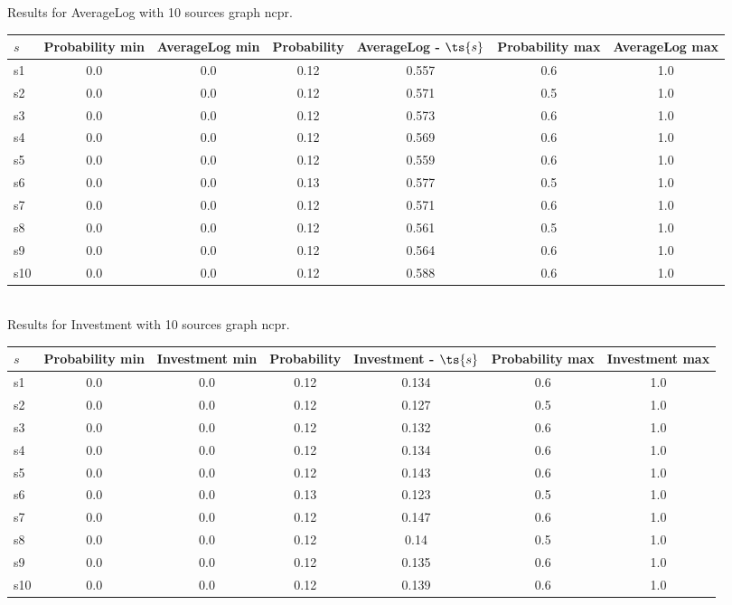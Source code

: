 \documentclass{article}
\begin{document}
\noindent Results for AverageLog with 10 sources graph ncpr.

\noindent\begin{tabular}{|l|c|c|c|c|c|c|}
\hline
$s$& Probability min & AverageLog min & Probability & AverageLog - $\ts{s}$ & Probability max & AverageLog max\\
\hline
s1 &0.0 & 0.0 & 0.12 & 0.557 & 0.6 & 1.0\\
\hline
s2 &0.0 & 0.0 & 0.12 & 0.571 & 0.5 & 1.0\\
\hline
s3 &0.0 & 0.0 & 0.12 & 0.573 & 0.6 & 1.0\\
\hline
s4 &0.0 & 0.0 & 0.12 & 0.569 & 0.6 & 1.0\\
\hline
s5 &0.0 & 0.0 & 0.12 & 0.559 & 0.6 & 1.0\\
\hline
s6 &0.0 & 0.0 & 0.13 & 0.577 & 0.5 & 1.0\\
\hline
s7 &0.0 & 0.0 & 0.12 & 0.571 & 0.6 & 1.0\\
\hline
s8 &0.0 & 0.0 & 0.12 & 0.561 & 0.5 & 1.0\\
\hline
s9 &0.0 & 0.0 & 0.12 & 0.564 & 0.6 & 1.0\\
\hline
s10 &0.0 & 0.0 & 0.12 & 0.588 & 0.6 & 1.0\\
\hline
\end{tabular}\\

\noindent Results for Investment with 10 sources graph ncpr.

\noindent\begin{tabular}{|l|c|c|c|c|c|c|}
\hline
$s$& Probability min & Investment min & Probability & Investment - $\ts{s}$ & Probability max & Investment max\\
\hline
s1 &0.0 & 0.0 & 0.12 & 0.134 & 0.6 & 1.0\\
\hline
s2 &0.0 & 0.0 & 0.12 & 0.127 & 0.5 & 1.0\\
\hline
s3 &0.0 & 0.0 & 0.12 & 0.132 & 0.6 & 1.0\\
\hline
s4 &0.0 & 0.0 & 0.12 & 0.134 & 0.6 & 1.0\\
\hline
s5 &0.0 & 0.0 & 0.12 & 0.143 & 0.6 & 1.0\\
\hline
s6 &0.0 & 0.0 & 0.13 & 0.123 & 0.5 & 1.0\\
\hline
s7 &0.0 & 0.0 & 0.12 & 0.147 & 0.6 & 1.0\\
\hline
s8 &0.0 & 0.0 & 0.12 & 0.14 & 0.5 & 1.0\\
\hline
s9 &0.0 & 0.0 & 0.12 & 0.135 & 0.6 & 1.0\\
\hline
s10 &0.0 & 0.0 & 0.12 & 0.139 & 0.6 & 1.0\\
\hline
\end{tabular}\\
\end{document}
